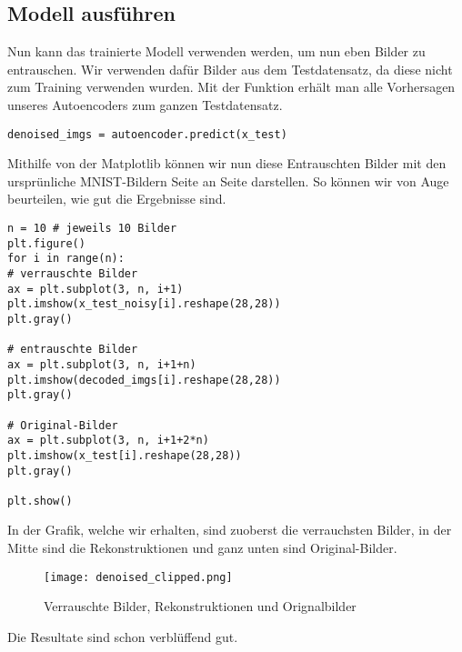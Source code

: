 \subsection{Modell ausführen}
Nun kann das trainierte Modell verwenden werden, um nun eben Bilder zu
entrauschen. Wir verwenden dafür Bilder aus dem Testdatensatz, da diese nicht
zum Training verwenden wurden. Mit der Funktion 
erhält man alle Vorhersagen unseres Autoencoders zum ganzen Testdatensatz.
\begin{verbatim}
denoised_imgs = autoencoder.predict(x_test)
\end{verbatim}
Mithilfe von der Matplotlib können wir nun diese Entrauschten Bilder mit den
ursprünliche MNIST-Bildern Seite an Seite darstellen. So können wir von Auge
beurteilen, wie gut die Ergebnisse sind.
\begin{verbatim}
n = 10 # jeweils 10 Bilder
plt.figure()
for i in range(n):
# verrauschte Bilder
ax = plt.subplot(3, n, i+1)
plt.imshow(x_test_noisy[i].reshape(28,28))
plt.gray()

# entrauschte Bilder
ax = plt.subplot(3, n, i+1+n)
plt.imshow(decoded_imgs[i].reshape(28,28))
plt.gray()

# Original-Bilder
ax = plt.subplot(3, n, i+1+2*n)
plt.imshow(x_test[i].reshape(28,28))
plt.gray()

plt.show()
\end{verbatim}
In der Grafik, welche wir erhalten, sind zuoberst die verrauchsten Bilder, in
der Mitte sind die Rekonstruktionen und ganz unten sind Original-Bilder.
\begin{figure}[h!]
  \centering
  \texttt{[image: denoised\_clipped.png]}
  \caption{Verrauschte Bilder, Rekonstruktionen und Orignalbilder}
\end{figure}
Die Resultate sind schon verblüffend gut.

